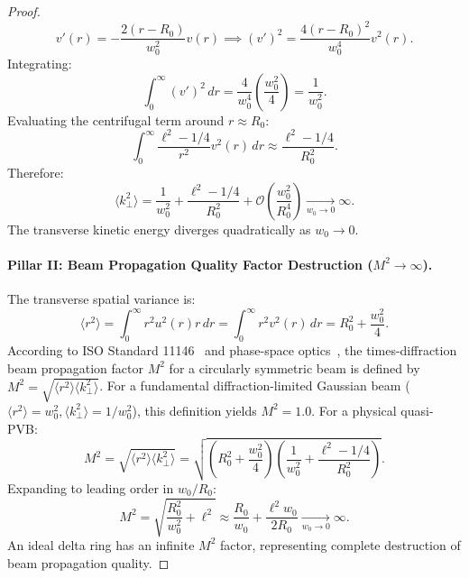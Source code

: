 \documentclass{optica-article}
\begin{document}
\begin{proof}
\begin{equation}
v'(r) = - \frac{2(r - R_0)}{w_0^2} v(r) \implies (v')^2 = \frac{4(r - R_0)^2}{w_0^4} v^2(r).
\label{eq:v_prime_squared}
\end{equation}
Integrating:
\begin{equation}
\int_0^\infty (v')^2 \, dr = \frac{4}{w_0^4} \left( \frac{w_0^2}{4} \right) = \frac{1}{w_0^2}.
\label{eq:v_prime_integral}
\end{equation}
Evaluating the centrifugal term around $r \approx R_0$:
\begin{equation}
\int_0^\infty \frac{\ell^2 - 1/4}{r^2} v^2(r) \, dr \approx \frac{\ell^2 - 1/4}{R_0^2}.
\label{eq:centrifugal_integral}
\end{equation}
Therefore:
\begin{equation}
\boxed{\langle k_\perp^2 \rangle = \frac{1}{w_0^2} + \frac{\ell^2 - 1/4}{R_0^2} + \mathcal{O}\left( \frac{w_0^2}{R_0^4} \right) \xrightarrow[w_0 \to 0]{} \infty.}
\label{eq:pillar1_result}
\end{equation}
The transverse kinetic energy diverges quadratically as $w_0 \to 0$.

\paragraph{Pillar II: Beam Propagation Quality Factor Destruction ($M^2 \to \infty$).}
The transverse spatial variance is:
\begin{equation}
\langle r^2 \rangle = \int_0^\infty r^2 u^2(r) r \, dr = \int_0^\infty r^2 v^2(r) \, dr = R_0^2 + \frac{w_0^2}{4}.
\label{eq:spatial_variance}
\end{equation}
According to ISO Standard 11146~\cite{ISO11146} and phase-space optics~\cite{Alonso2011}, the times-diffraction beam propagation factor $M^2$ for a circularly symmetric beam is defined by $M^2 = \sqrt{\langle r^2 \rangle \langle k_\perp^2 \rangle}$. For a fundamental diffraction-limited Gaussian beam ($\langle r^2 \rangle = w_0^2, \langle k_\perp^2 \rangle = 1/w_0^2$), this definition yields $M^2 = 1.0$. For a physical quasi-PVB:
\begin{equation}
M^2 = \sqrt{\langle r^2 \rangle \langle k_\perp^2 \rangle} = \sqrt{\left( R_0^2 + \frac{w_0^2}{4} \right)\left( \frac{1}{w_0^2} + \frac{\ell^2 - 1/4}{R_0^2} \right)}.
\label{eq:m2_formula}
\end{equation}
Expanding to leading order in $w_0 / R_0$:
\begin{equation}
\boxed{M^2 = \sqrt{\frac{R_0^2}{w_0^2} + \ell^2} \approx \frac{R_0}{w_0} + \frac{\ell^2 w_0}{2 R_0} \xrightarrow[w_0 \to 0]{} \infty.}
\label{eq:pillar2_result}
\end{equation}
An ideal delta ring has an infinite $M^2$ factor, representing complete destruction of beam propagation quality.


\end{proof}
\end{document}
